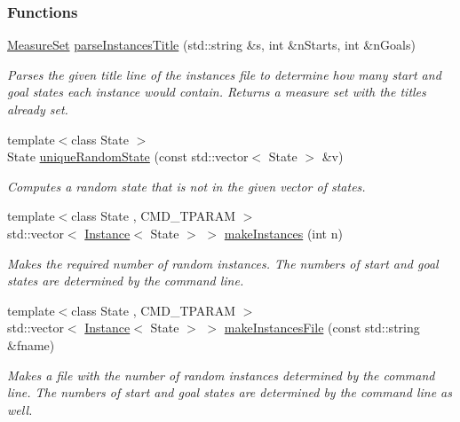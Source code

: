 \subsubsection*{Functions}
\begin{DoxyCompactItemize}
\item 
\hyperlink{structslb_1_1core_1_1sb_1_1MeasureSet}{Measure\+Set} \hyperlink{namespaceslb_1_1core_1_1sb_a1866330cbea23527482f996faad8b3c4}{parse\+Instances\+Title} (std\+::string \&s, int \&n\+Starts, int \&n\+Goals)
\begin{DoxyCompactList}\small\item\em Parses the given title line of the instances file to determine how many start and goal states each instance would contain. Returns a measure set with the titles already set. \end{DoxyCompactList}\item 
{\footnotesize template$<$class State $>$ }\\State \hyperlink{namespaceslb_1_1core_1_1sb_a68dfc95bb83fc37be7bbaf9d8ea14557}{unique\+Random\+State} (const std\+::vector$<$ State $>$ \&v)
\begin{DoxyCompactList}\small\item\em Computes a random state that is not in the given vector of states. \end{DoxyCompactList}\item 
{\footnotesize template$<$class State , C\+M\+D\+\_\+\+T\+P\+A\+R\+AM $>$ }\\std\+::vector$<$ \hyperlink{structslb_1_1core_1_1sb_1_1Instance}{Instance}$<$ State $>$ $>$ \hyperlink{namespaceslb_1_1core_1_1sb_a7f194d59f1e10da41faa6d30644e1e06}{make\+Instances} (int n)
\begin{DoxyCompactList}\small\item\em Makes the required number of random instances. The numbers of start and goal states are determined by the command line. \end{DoxyCompactList}\item 
{\footnotesize template$<$class State , C\+M\+D\+\_\+\+T\+P\+A\+R\+AM $>$ }\\std\+::vector$<$ \hyperlink{structslb_1_1core_1_1sb_1_1Instance}{Instance}$<$ State $>$ $>$ \hyperlink{namespaceslb_1_1core_1_1sb_af8a099333bcb967b7c5fdbe18e004631}{make\+Instances\+File} (const std\+::string \&fname)
\begin{DoxyCompactList}\small\item\em Makes a file with the number of random instances determined by the command line. The numbers of start and goal states are determined by the command line as well. \end{DoxyCompactList}\item 

\end{DoxyCompactItemize}
